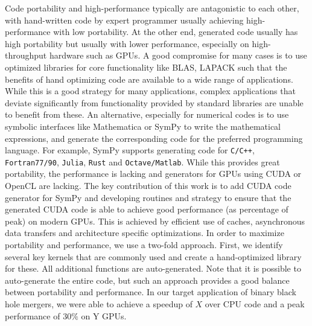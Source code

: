 Code portability and high-performance typically are antagonistic to each other, with hand-written code by expert programmer usually achieving high-performance with low portability. At the other end, generated code usually has high portability but usually with lower performance, especially on high-throughput hardware such as GPUs. A good compromise for many cases is to use optimized libraries for core functionality like BLAS, LAPACK \cite{blas,clawpack} such that the benefits of hand optimizing code are available to a wide range of applications. While this is a good strategy for many applications, complex applications that deviate significantly from functionality provided by standard libraries are unable to benefit from these. An alternative, especially for numerical codes is to use symbolic interfaces like Mathematica \cite{mathematica} or SymPy \cite{sympy} to write the mathematical expressions, and generate the corresponding code for the preferred programming language. For example, SymPy supports generating code for \texttt{C/C++}, \texttt{Fortran77/90}, \texttt{Julia}, \texttt{Rust} and \texttt{Octave/Matlab}. While this provides great portability, the performance is lacking and generators for GPUs using CUDA or OpenCL are lacking. The key contribution of this work is to add CUDA code generator for SymPy and developing routines and strategy to ensure that the generated CUDA code is able to achieve good performance (as percentage of peak) on modern GPUs. This is achieved by efficient use of caches, asynchronous data transfers and architecture specific optimizations. In order to maximize portability and performance, we use a two-fold approach. First, we identify several key kernels that are commonly used and create a hand-optimized library for these. All additional functions are auto-generated. Note that it is possible to auto-generate the entire code, but such an approach provides a good balance between portability and performance. In our target application of binary black hole mergers, we were able to achieve a speedup of $X$ over CPU code and a peak performance of $30\%$ on Y GPUs.  


